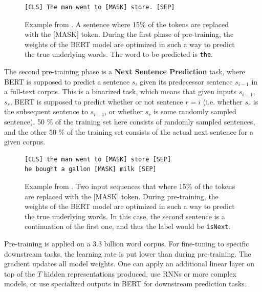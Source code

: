 \documentclass[a4paper,12pt,oneside,openright]{report}
\begin{document}
\begin{tcolorbox}
\begin{figure}[H]
\begin{verbatim}
[CLS] The man went to [MASK] store. [SEP]
\end{verbatim}
Example from \cite{devlin18}. 
A sentence where 15\% of the tokens are replaced with the [MASK] token. 
During the first phase of pre-training, the weights of the BERT model are optimized in such a way to predict the true underlying words.
The word to be predicted is \texttt{the}.
\end{figure}
\end{tcolorbox}

The second pre-training phase is a \textbf{Next Sentence Prediction} task, where BERT is supposed to predict a sentence $s_i$ given its predecessor sentence $s_{i-1}$ in a full-text corpus.
This is a binarized task, which means that given inputs $s_{i-1}$, $s_r$, BERT is supposed to predict whether or not sentence $r = i$ (i.e. whether $s_r$ is the subsequent sentence to $s_{i-1}$, or whether $s_r$ is some randomly sampled sentence).
50 \% of the training set here consists of randomly sampled sentences, and the other 50 \% of the training set consists of the actual next sentence for a given corpus.

\begin{tcolorbox}
\begin{figure}[H]
\begin{verbatim}
[CLS] the man went to [MASK] store [SEP]
he bought a gallon [MASK] milk [SEP]
\end{verbatim}
Example from \cite{devlin18}. 
Two input sequences that where 15\% of the tokens are replaced with the [MASK] token. 
During pre-training, the weights of the BERT model are optimized in such a way to predict the true underlying words.
In this case, the second sentence is a continuation of the first one, and thus the label would be \texttt{isNext}.
\end{figure}
\end{tcolorbox}

Pre-training is applied on a 3.3 billion word corpus.
For fine-tuning to specific downstream tasks, the learning rate is put lower than during pre-training.
The gradient updates all model weights.
One can apply an additional linear layer on top of the $T$ hidden representations produced, use RNNs or more complex models, or use specialized outputs in BERT for downstream prediction tasks.
\end{document}
